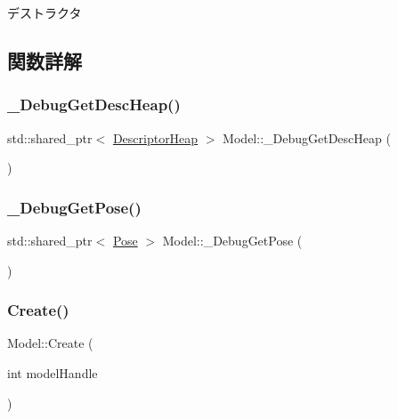 デストラクタ 



\subsection{関数詳解}
\mbox{\label{class_model_a6f5a9f4a413ce2d4e03314ee95a86725}} 
\subsubsection{\texorpdfstring{\+\_\+\+Debug\+Get\+Desc\+Heap()}{\_DebugGetDescHeap()}}
{\footnotesize\ttfamily std\+::shared\+\_\+ptr$<$ \mbox{\hyperlink{class_descriptor_heap}{Descriptor\+Heap}} $>$ Model\+::\+\_\+\+Debug\+Get\+Desc\+Heap (\begin{DoxyParamCaption}{ }\end{DoxyParamCaption})}

\mbox{\label{class_model_ae348f27e9cb5cdee6e32029d4ef48300}} 
\subsubsection{\texorpdfstring{\+\_\+\+Debug\+Get\+Pose()}{\_DebugGetPose()}}
{\footnotesize\ttfamily std\+::shared\+\_\+ptr$<$ \mbox{\hyperlink{class_pose}{Pose}} $>$ Model\+::\+\_\+\+Debug\+Get\+Pose (\begin{DoxyParamCaption}{ }\end{DoxyParamCaption})}

\mbox{\label{class_model_a82c645e8d4ca6f65297751dc9453d6af}} 
\subsubsection{\texorpdfstring{Create()}{Create()}}
{\footnotesize\ttfamily Model\+::\+Create (\begin{DoxyParamCaption}\item[{int}]{model\+Handle }\end{DoxyParamCaption})\hspace{0.3cm}{\ttfamily [static]}}


